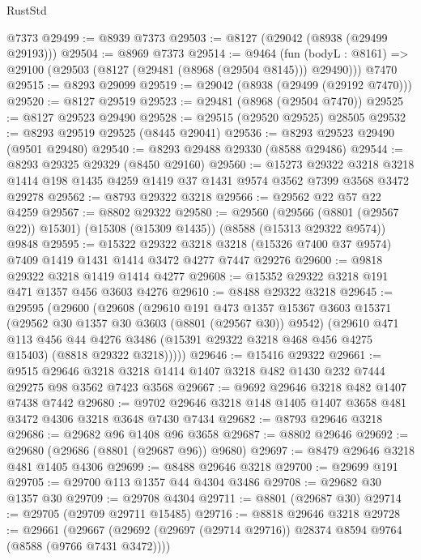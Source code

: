 \begin{lexlean}{RustStd}
\begin{coremodule}
    @7373
@29499 := @8939 @7373
@29503 := @8127 (@29042 (@8938 (@29499 @29193)))
@29504 := @8969 @7373
@29514 := @9464
    (fun (bodyL : @8161) => @29100 (@29503 (@8127 (@29481 (@8968 (@29504 @8145))) @29490)))
    @7470
@29515 := @8293 @29099
@29519 := @29042 (@8938 (@29499 (@29192 @7470)))
@29520 := @8127 @29519
@29523 := @29481 (@8968 (@29504 @7470))
@29525 := @8127 @29523 @29490
@29528 := @29515 (@29520 @29525) @28505
@29532 := @8293 @29519 @29525 (@8445 @29041)
@29536 := @8293 @29523 @29490 (@9501 @29480)
@29540 := @8293 @29488 @29330 (@8588 @29486)
@29544 := @8293 @29325 @29329 (@8450 @29160)
@29560 := @15273
    @29322
    @3218
    @3218
    @1414
    @198
    @1435
    @4259
    @1419
    @37
    @1431
    @9574
    @3562
    @7399
    @3568
    @3472
    @29278
@29562 := @8793 @29322 @3218
@29566 := @29562 @22 @57 @22 @4259
@29567 := @8802 @29322
@29580 := @29560
    (@29566 (@8801 (@29567 @22)) @15301)
    (@15308 (@15309 @1435))
    (@8588 (@15313 @29322 @9574))
    @9848
@29595 := @15322
    @29322
    @3218
    @3218
    (@15326 @7400 @37 @9574)
    @7409
    @1419
    @1431
    @1414
    @3472
    @4277
    @7447
    @29276
@29600 := @9818 @29322 @3218 @1419 @1414 @4277
@29608 := @15352 @29322 @3218 @191 @471 @1357 @456 @3603 @4276
@29610 := @8488 @29322 @3218
@29645 := @29595
    (@29600
      (@29608
        (@29610
          @191
          @473
          @1357
          @15367
          @3603
          @15371
          (@29562 @30 @1357 @30 @3603 (@8801 (@29567 @30)) @9542)
          (@29610
            @471
            @113
            @456
            @44
            @4276
            @3486
            (@15391 @29322 @3218 @468 @456 @4275 @15403)
            (@8818 @29322 @3218)))))
@29646 := @15416 @29322
@29661 := @9515
    @29646
    @3218
    @3218
    @1414
    @1407
    @3218
    @482
    @1430
    @232
    @7444
    @29275
    @98
    @3562
    @7423
    @3568
@29667 := @9692 @29646 @3218 @482 @1407 @7438 @7442
@29680 := @9702 @29646 @3218 @148 @1405 @1407 @3658 @481 @3472 @4306 @3218 @3648 @7430 @7434
@29682 := @8793 @29646 @3218
@29686 := @29682 @96 @1408 @96 @3658
@29687 := @8802 @29646
@29692 := @29680 (@29686 (@8801 (@29687 @96)) @9680)
@29697 := @8479 @29646 @3218 @481 @1405 @4306
@29699 := @8488 @29646 @3218
@29700 := @29699 @191
@29705 := @29700 @113 @1357 @44 @4304 @3486
@29708 := @29682 @30 @1357 @30
@29709 := @29708 @4304
@29711 := @8801 (@29687 @30)
@29714 := @29705 (@29709 @29711 @15485)
@29716 := @8818 @29646 @3218
@29728 := @29661
    (@29667 (@29692 (@29697 (@29714 @29716)) @28374 @8594 @9764 (@8588 (@9766 @7431 @3472))))

\end{coremodule}
\end{lexlean}
